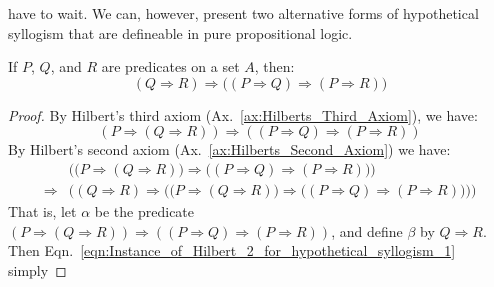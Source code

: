     have to wait. We can, however, present two alternative forms of hypothetical
    syllogism that are defineable in pure propositional logic.
    \begin{theorem}
        \label{thm:hypothetical_syllogism_1}%
        If $P$, $Q$, and $R$ are predicates on a set $A$, then:
        \begin{equation*}
            (Q\Rightarrow{R})\Rightarrow
            \big(
                (P\Rightarrow{Q})\Rightarrow(P\Rightarrow{R})
            \big)
        \end{equation*}
    \end{theorem}
    \begin{proof}
        By Hilbert's third axiom (Ax.~\ref{ax:Hilberts_Third_Axiom}), we
        have:
        \begin{equation}
            \label{eqn:instance_of_Hilbert_1_hypothetical_syllogism_1}%
            (P\Rightarrow(Q\Rightarrow{R}))\Rightarrow
            ((P\Rightarrow{Q})\Rightarrow(P\Rightarrow{R}))
        \end{equation}
        By Hilbert's second axiom (Ax.~\ref{ax:Hilberts_Second_Axiom}) we have:
        \begin{equation}
            \label{eqn:Instance_of_Hilbert_2_for_hypothetical_syllogism_1}%
            \begin{split}
                &\Big(
                    \big(
                        P\Rightarrow(Q\Rightarrow{R})
                    \big)
                    \Rightarrow
                    \big(
                        (P\Rightarrow{Q})\Rightarrow(P\Rightarrow{R})
                    \big)
                \Big)\\
                \Rightarrow&
                \bigg(
                    (Q\Rightarrow{R})\Rightarrow
                    \Big(
                        \big(
                            P\Rightarrow(Q\Rightarrow{R})
                        \big)
                        \Rightarrow
                        \big(
                            (P\Rightarrow{Q})\Rightarrow(P\Rightarrow{R})
                        \big)
                    \Big)
                \bigg)
            \end{split}
        \end{equation}
        That is, let $\alpha$ be the predicate
        $(P\Rightarrow(Q\Rightarrow{R}))\Rightarrow%
         ((P\Rightarrow{Q})\Rightarrow(P\Rightarrow{R}))$,
        and define $\beta$ by $Q\Rightarrow{R}$. Then
        Eqn.~\ref{eqn:Instance_of_Hilbert_2_for_hypothetical_syllogism_1} simply

\end{proof}
